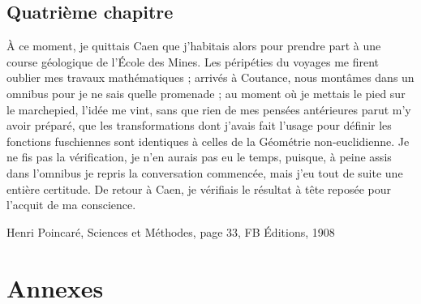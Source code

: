 \documentclass[a4paper, 11pt]{report}
\begin{document}
\chapter{Quatrième chapitre}
\epigraph{À ce moment, je quittais Caen que j'habitais alors pour prendre part à une course géologique de l'École des Mines. Les péripéties du voyages me firent oublier mes travaux mathématiques ; arrivés à Coutance, nous montâmes dans un omnibus pour je ne sais quelle promenade ; au moment où je mettais le pied sur le marchepied, l'idée me vint, sans que rien de mes pensées antérieures parut m'y avoir préparé, que les transformations dont j'avais fait l'usage pour définir les fonctions fuschiennes sont identiques à celles de la Géométrie non-euclidienne. Je ne fis pas la vérification, je n'en aurais pas eu le temps, puisque, à peine assis dans l'omnibus je repris la conversation commencée, mais j'eu tout de suite une entière certitude. De retour à Caen, je vérifiais le résultat à tête reposée pour l'acquit de ma conscience.}{Henri Poincaré, Sciences et Méthodes, page 33, FB Éditions, 1908}

\part*{Annexes}



\end{document}
